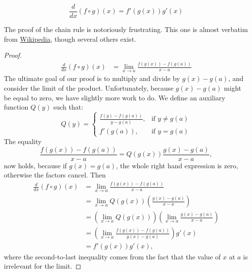 \documentclass{article}
\begin{document}
\begin{theorem}
$$ \frac{d}{dx} (f \circ g)(x) = f'(g(x))g'(x) $$
\end{theorem}

\begin{remark}
The proof of the chain rule is notoriously frustrating. This one is almost verbatim from \href{https://en.wikipedia.org/wiki/Chain_rule#First_proof}{Wikipedia}, though several others exist.
\end{remark}

\begin{proof}
\begin{align}
\frac{d}{dx} (f \circ g)(x) &= \lim_{x \to a} \frac{f(g(x)) - f(g(a))}{x - a}
\end{align}
The ultimate goal of our proof is to multiply and divide by $g(x) - g(a)$, and consider the limit of the product. Unfortunately, because $g(x) - g(a)$ might be equal to zero, we have slightly more work to do. We define an auxiliary function $Q(y)$ such that:
$$Q(y) = \begin{cases}
    \frac{f(y) - f(g(a))}{y - g(a)}, & \text{if } y \neq g(a) \\
    f'(g(a)), & \text{if }y = g(a) 
\end{cases}$$
The equality
\[
    \frac{f(g(x)) - f(g(a))}{x - a} = Q(g(x)) \frac{g(x) - g(a)}{x - a},
\]
now holds, because if $g(x) = g(a)$, the whole right hand expression is zero, otherwise the factors cancel. Then
\begin{align*}
\frac{d}{dx} (f \circ g)(x) &= \lim_{x \to a} \frac{f(g(x)) - f(g(a))}{x - a} \\
&= \lim_{x \to a} Q(g(x))\left( \frac{g(x) - g(a)}{x - a}\right) \\
&= \left( \lim_{x \to a} Q(g(x)) \right) \left( \lim_{x \to a} \frac{g(x) - g(a)}{x - a} \right) \\
&= \left( \lim_{x \to a} \frac{f(g(x)) - f(g(a))}{g(x) - g(a)}\right) g'(x) \\
&= f'(g(x))g'(x),
\end{align*}
where the second-to-last inequality comes from the fact that the value of $x$ at $a$ is irrelevant for the limit.  
\end{proof}
\end{document}
